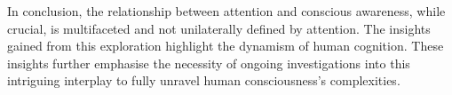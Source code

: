 \documentclass[10pt]{article}
\begin{document}
\begin{sloppypar}
  In conclusion, the relationship between attention and conscious awareness, while crucial, is multifaceted and not unilaterally defined by attention. The insights gained from this exploration highlight the dynamism of human cognition. These insights further emphasise the necessity of ongoing investigations into this intriguing interplay to fully unravel human consciousness’s complexities.

  \pagebreak
  \singlespacing %
  
  

\end{sloppypar}
\end{document}
